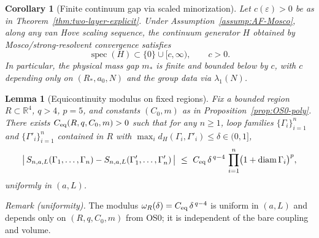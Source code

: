 \documentclass[11pt]{amsart}
\theoremstyle{plain}
\newtheorem{lemma}[theorem]{Lemma}
\newtheorem{corollary}[theorem]{Corollary}
\theoremstyle{definition}
\theoremstyle{remark}
\begin{document}
\begin{corollary}[Finite continuum gap via scaled minorization]\label{cor:scaled-continuum-gap}
Let $c(\varepsilon)>0$ be as in Theorem~\ref{thm:two-layer-explicit}. Under Assumption~\ref{assump:AF-Mosco}, along any van Hove scaling sequence, the continuum generator $H$ obtained by Mosco/strong-resolvent convergence satisfies
\[
  \operatorname{spec}(H)\subset\{0\}\cup[c,\infty),\qquad c>0.
\]
In particular, the physical mass gap $m_*$ is finite and bounded below by $c$, with $c$ depending only on $(R_*,a_0,N)$ and the group data via $\lambda_1(N)$.
\end{corollary}
\medskip
\begin{lemma}[Equicontinuity modulus on fixed regions]\label{lem:eqc-modulus}
Fix a bounded region $R\subset\mathbb R^4$, $q>4$, $p=5$, and constants $(C_0,m)$ as in Proposition~\ref{prop:OS0-poly}. There exists $C_{\rm eq}(R,q,C_0,m)>0$ such that for any $n\ge 1$, loop families $\{\Gamma_i\}_{i=1}^n$ and $\{\Gamma'_i\}_{i=1}^n$ contained in $R$ with $\max_i d_H(\Gamma_i,\Gamma'_i)\le \delta\in(0,1]$,
\[
  \big|\,S_{n,a,L}(\Gamma_1,\dots,\Gamma_n) - S_{n,a,L}(\Gamma'_1,\dots,\Gamma'_n)\,\big|
  \ \le\ C_{\rm eq}\,\delta^{\,q-4}\,\prod_{i=1}^n \bigl(1+\operatorname{diam}\Gamma_i\bigr)^p,
\]
uniformly in $(a,L)$.
\end{lemma}
\noindent\emph{Remark (uniformity).} The modulus $\omega_R(\delta)=C_{\rm eq}\,\delta^{\,q-4}$ is uniform in $(a,L)$ and depends only on $(R,q,C_0,m)$ from OS0; it is independent of the bare coupling and volume.
\end{document}
